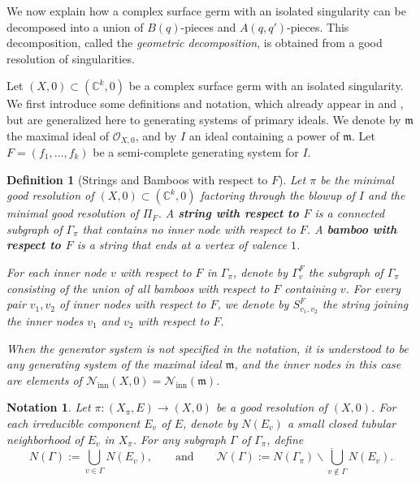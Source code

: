 \documentclass[reqno,dvipsnames,12pt]{amsart}
\renewcommand{\setminus}{\smallsetminus}
\newtheorem{nota}[thm]{Notation}
\newtheorem{defi}[thm]{Definition}
\begin{document}
We now explain how a complex surface germ with an isolated singularity can be decomposed into a union of $B(q)$-pieces and $A(q,q')$-pieces. This decomposition, called the \emph{geometric decomposition}, is obtained from a good resolution of  singularities. 


Let $(X,0) \subset (\mathbb{C}^k,0)$ be a complex surface germ with an isolated singularity. We first introduce some definitions and notation, which already appear in \cite{pichonintroduction} and \cite{BNP}, but are generalized here to generating systems of primary ideals. We denote by $\mathfrak{m}$ the maximal ideal of $\mathcal{O}_{X,0}$, and by $I$ an ideal containing a power of $\mathfrak{m}$. Let $F=(f_1,\dots,f_k)$ be a semi-complete generating system for $I$.



\begin{defi}[Strings and Bamboos with respect to $F$]\label{stringandbomboos}
Let $\pi$ be the minimal good resolution of $(X,0) \subset (\mathbb{C}^k,0)$ factoring through the blowup of $I$ and the minimal good resolution of $\Pi_F$. A \textbf{string with respect to $F$} is a connected subgraph of $\Gamma_{\pi}$ that contains no inner node with respect to $F$. A \textbf{bamboo with respect to $F$} is a string that ends at a vertex of valence $1$.  

For each inner node $v$ with respect to $F$ in $\Gamma_{\pi}$, denote by $\Gamma_v^F$ the subgraph of $\Gamma_{\pi}$ consisting of the union of all bamboos with respect to $F$ containing $v$. For every pair $v_1, v_2$ of inner nodes with respect to $F$, we denote by $S_{v_1,v_2}^F$ the string joining the inner nodes $v_1$ and $v_2$ with respect to $F$.  

When the generator system is   not specified in the notation, it is understood to be any generating system of the  maximal ideal $\mathfrak{m}$, and the inner nodes in this case are elements of $\mathcal{N}_{\mathrm{inn}}(X,0) = \mathcal{N}_{\mathrm{inn}}(\mathfrak{m})$.
\end{defi}

\begin{nota}
Let $\pi: (X_{\pi},E) \longrightarrow (X,0)$ be a good resolution of $(X,0)$. For each irreducible component $E_v$ of $E$, denote by $N(E_v)$ a small closed tubular neighborhood of $E_v$ in $X_\pi$. For any subgraph $\Gamma$ of $\Gamma_{\pi}$, define  
\[
N(\Gamma) := \bigcup_{v \in \Gamma} N(E_v), \qquad \text{and} \qquad
\mathcal{N}(\Gamma) := \overline{N(\Gamma_{\pi}) \setminus \bigcup_{v \notin \Gamma} N(E_v)}.
\]
\end{nota}
\end{document}
